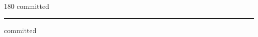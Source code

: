 
\begin{frame}
\begin{center}
\begin{turn}{180}
{\fontsize{2.5cm}{1em}\selectfont committed}
\end{turn}
\vspace{1em}\par  
\hrule
\vspace{1em}\par  
{\fontsize{2.5cm}{1em}\selectfont committed}
\end{center}
\end{frame}
